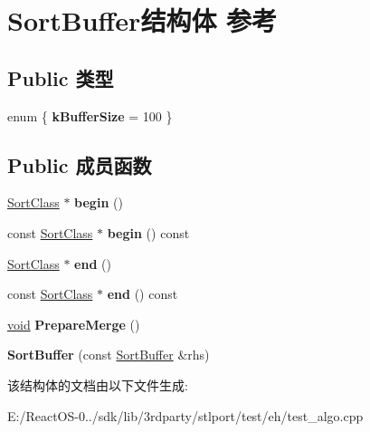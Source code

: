 \hypertarget{struct_sort_buffer}{}\section{Sort\+Buffer结构体 参考}
\label{struct_sort_buffer}
\subsection*{Public 类型}
\begin{DoxyCompactItemize}
\item 
\mbox{\label{struct_sort_buffer_a479c724c4e40feac60125d0069544f9c}} 
enum \{ {\bfseries k\+Buffer\+Size} = 100
 \}
\end{DoxyCompactItemize}
\subsection*{Public 成员函数}
\begin{DoxyCompactItemize}
\item 
\mbox{\label{struct_sort_buffer_a05042fabd2f6574fe3d5d050bcc138ec}} 
\hyperlink{class_sort_class}{Sort\+Class} $\ast$ {\bfseries begin} ()
\item 
\mbox{\label{struct_sort_buffer_a4ace6d132a3a30ff8d34d132853e03c5}} 
const \hyperlink{class_sort_class}{Sort\+Class} $\ast$ {\bfseries begin} () const
\item 
\mbox{\label{struct_sort_buffer_a38e2232741edcfeb54c1f3fb941d164e}} 
\hyperlink{class_sort_class}{Sort\+Class} $\ast$ {\bfseries end} ()
\item 
\mbox{\label{struct_sort_buffer_a90fa58cde45af7c60150de5a3d64eed7}} 
const \hyperlink{class_sort_class}{Sort\+Class} $\ast$ {\bfseries end} () const
\item 
\mbox{\label{struct_sort_buffer_a91fb49d191330de59a8716f56a607cc1}} 
\hyperlink{interfacevoid}{void} {\bfseries Prepare\+Merge} ()
\item 
\mbox{\label{struct_sort_buffer_af13b097191bc005ab00ad8b6151e005b}} 
{\bfseries Sort\+Buffer} (const \hyperlink{struct_sort_buffer}{Sort\+Buffer} \&rhs)
\end{DoxyCompactItemize}


该结构体的文档由以下文件生成\+:\begin{DoxyCompactItemize}
\item 
E\+:/\+React\+O\+S-\/0../sdk/lib/3rdparty/stlport/test/eh/test\+\_\+algo.\+cpp\end{DoxyCompactItemize}
